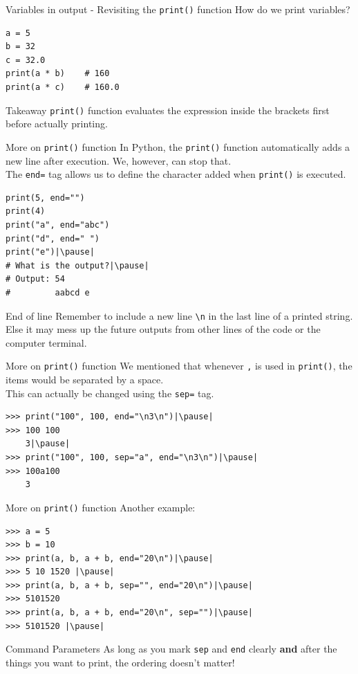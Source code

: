 \documentclass[dvipsnames, svgnames, x11names, handout]{beamer}
\begin{document}
\begin{frame}[fragile]{Variables in output - Revisiting the \texttt{print()} function}
How do we print variables?

\begin{verbatim}
a = 5
b = 32
c = 32.0
print(a * b)    # 160
print(a * c)    # 160.0
\end{verbatim}
\pause
\begin{block}{Takeaway}
\texttt{print()} function evaluates the expression inside the brackets first before actually printing.
\end{block}
\end{frame}

\begin{frame}[fragile]{More on \texttt{print()} function}
In Python, the \texttt{print()} function automatically adds a new line after execution. We, however, can stop that.\\
The \texttt{end=} tag allows us to define the character added when \texttt{print()} is executed.
\begin{verbatim}
print(5, end="")
print(4)
print("a", end="abc")
print("d", end=" ")
print("e")|\pause|
# What is the output?|\pause|
# Output: 54
#         aabcd e
\end{verbatim}
\begin{block}{End of line}
Remember to include a new line {\color{BrickRed}\texttt{\textbackslash n}} in the last line of a printed string.\\
Else it may mess up the future outputs from other lines of the code or the computer terminal.
\end{block}
\end{frame}

\begin{frame}[fragile]{More on \texttt{print()} function}
We mentioned that whenever \texttt{,} is used in \texttt{print()}, the items would be separated by a space.\\
This can actually be changed using the \texttt{sep=} tag.\pause
\begin{verbatim}
>>> print("100", 100, end="\n3\n")|\pause|
>>> 100 100
	3|\pause|
>>> print("100", 100, sep="a", end="\n3\n")|\pause|
>>> 100a100
	3
\end{verbatim}

\end{frame}

\begin{frame}[fragile]{More on \texttt{print()} function}
Another example:
\begin{verbatim}
>>> a = 5
>>> b = 10
>>> print(a, b, a + b, end="20\n")|\pause|
>>> 5 10 1520 |\pause|
>>> print(a, b, a + b, sep="", end="20\n")|\pause|
>>> 5101520	
>>> print(a, b, a + b, end="20\n", sep="")|\pause|
>>> 5101520	|\pause|
\end{verbatim}
\begin{block}{Command Parameters}
As long as you mark \texttt{sep} and \texttt{end} clearly \textbf{and} after the things you want to print, the ordering doesn't matter!
\end{block}
\end{frame}
\end{document}
